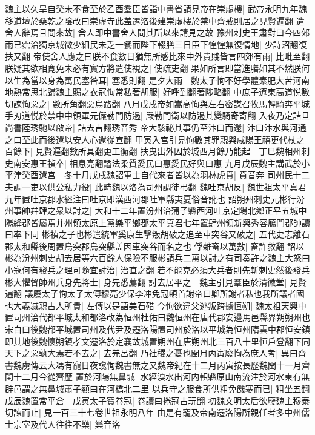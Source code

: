 魏主以久旱自癸未不食至於乙酉羣臣皆詣中書省請見帝在崇虚樓|{
	武帝永明九年魏移道壇於桑乾之陰改曰崇虚寺此盖遷洛後建崇虛樓於禁中齊戒則居之見賢遍翻}
遣舍人辭焉且問來故|{
	舍人即中書舍人問其所以來請見之故}
豫州刺史王肅對曰今四郊雨已霑洽獨京城微少細民未乏一餐而陛下輟膳三日臣下惶惶無復情地|{
	少詩沼翻復扶又翻}
帝使舍人應之曰朕不食數日猶無所感比來中外貴賤皆言四郊有雨|{
	比毗至翻}
朕疑其欲相寛免未必有實方將遣使視之|{
	使疏吏翻}
果如所言即當進膳如其不然朕何以生為當以身為萬民塞咎耳|{
	塞悉則翻}
是夕大雨　魏太子恂不好學體素肥大苦河南地熱常思北歸魏主賜之衣冠恂常私著胡服|{
	好呼到翻著陟略翻}
中庶子遼東高道悦數切諫恂惡之|{
	數所角翻惡烏路翻}
八月戊戌帝如嵩高恂與左右密謀召牧馬輕騎奔平城手刃道悦於禁中中領軍元儼勒門防遏|{
	嚴勒門衛以防遏其變騎奇寄翻}
入夜乃定詰旦尚書陸琇馳以啟帝|{
	詰去吉翻琇音秀}
帝大駭祕其事仍至汴口而還|{
	汴口汴水與河通之口至此而後還以安人心還從宣翻}
甲寅入宫引見恂數其罪親與咸陽王禧更代杖之百餘下|{
	見賢遍翻數所具翻更工衡翻}
扶曳出外囚於城西月餘乃能起　丁巳魏相州刺史南安惠王禎卒|{
	相息亮翻謚法柔質愛民曰惠愛民好與曰惠}
九月戊辰魏主講武於小平津癸酉還宫　冬十月戊戌魏詔軍士自代來者皆以為羽林虎賁|{
	賁音奔}
司州民十二夫調一吏以供公私力役|{
	此時魏以洛為司州調徒弔翻}
魏吐京胡反|{
	魏世祖太平真君九年置吐京郡水經注曰吐京即漢西河郡吐軍縣夷夏俗音訛也}
詔朔州刺史元彬行汾州事帥幷肆之衆以討之|{
	大和十二年置汾州治蒲子縣西河吐京定陽北鄉正平五城中陽絳郡皆屬焉并州領太原上黨樂平鄉郡太平真君七年置肆州領新興秀容鴈門郡帥讀曰率下同}
彬禎之子也彬遣統軍奚康生擊叛胡破之追至車突谷又破之|{
	五代史志離石郡太和縣後周置烏突郡烏突縣盖因車突谷而名之也}
俘雜畜以萬數|{
	畜許救翻}
詔以彬為汾州刺史胡去居等六百餘人保險不服彬請兵二萬以討之有司奏許之魏主大怒曰小寇何有發兵之理可隨宜討治|{
	治直之翻}
若不能克必須大兵者則先斬刺史然後發兵彬大懼督帥州兵身先將士|{
	身先悉薦翻}
討去居平之　魏主引見羣臣於清徽堂|{
	見賢遍翻}
議廢太子恂太子太傅穆亮少保李冲免冠頓首謝帝曰卿所謝者私也我所議者國也大義㓕親古人所貴|{
	左傳以是語美石碏}
今恂欲違父逃叛跨據恒朔|{
	魏太祖天興中置司州治代都平城太和都洛改為恒州杜佑曰魏恒州在唐代郡安邊馬邑縣界朔朔州也宋白曰後魏都平城置司州及代尹及遷洛陽置司州於洛以平城為恒州隋雲中郡恒安鎮即其地後魏懷朔鎮孝文遷洛於定襄故城置朔州在唐朔州北三百八十里恒戶登翻下同}
天下之惡孰大焉若不去之|{
	去羌呂翻}
乃社稷之憂也閏月丙寅廢恂為庶人考|{
	異曰齊書魏虜傳云大馮有寵日夜讒恂魏書無之又魏帝紀在十二月丙寅按長歷魏閏十一月齊閏十二月今從齊歷}
置於河陽無鼻城|{
	水經溴水出河内軹縣原山南流注於河水東有無辟邑謂之無鼻城蕭子顯曰在河橋北二里}
以兵守之服食所供粗免饑寒而已|{
	粗坐五翻}
戊辰魏置常平倉　戊寅太子寶卷冠|{
	卷讀曰捲冠古玩翻}
初魏文明太后欲廢魏主穆泰切諫而止|{
	見一百三十七卷世祖永明八年}
由是有寵及帝南遷洛陽所親任者多中州儒士宗室及代人往往不樂|{
	樂音洛}
